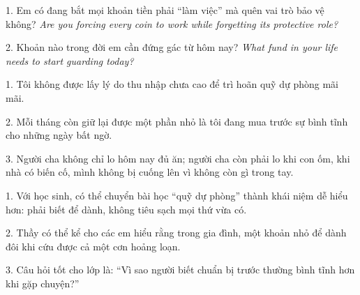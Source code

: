 \begin{tuhocnhanh}
1. Em có đang bắt mọi khoản tiền phải ``làm việc'' mà quên vai trò bảo vệ không? \textit{Are you forcing every coin to work while forgetting its protective role?}

2. Khoản nào trong đời em cần đứng gác từ hôm nay? \textit{What fund in your life needs to start guarding today?}
\end{tuhocnhanh}

\begin{turanminh}
1. Tôi không được lấy lý do thu nhập chưa cao để trì hoãn quỹ dự phòng mãi mãi.

2. Mỗi tháng còn giữ lại được một phần nhỏ là tôi đang mua trước sự bình tĩnh cho những ngày bất ngờ.

3. Người cha không chỉ lo hôm nay đủ ăn; người cha còn phải lo khi con ốm, khi nhà có biến cố, mình không bị cuống lên vì không còn gì trong tay.
\end{turanminh}

\begin{dayhoc}
1. Với học sinh, có thể chuyển bài học ``quỹ dự phòng'' thành khái niệm dễ hiểu hơn: phải biết để dành, không tiêu sạch mọi thứ vừa có.

2. Thầy có thể kể cho các em hiểu rằng trong gia đình, một khoản nhỏ để dành đôi khi cứu được cả một cơn hoảng loạn.

3. Câu hỏi tốt cho lớp là: ``Vì sao người biết chuẩn bị trước thường bình tĩnh hơn khi gặp chuyện?''
\end{dayhoc}